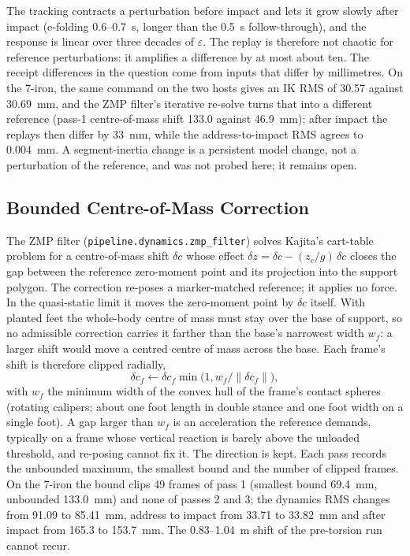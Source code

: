 \documentclass[11pt,a4paper]{article}
\begin{document}
The tracking contracts a perturbation before impact and lets it grow slowly
after impact (e-folding 0.6--0.7~s, longer than the 0.5~s follow-through),
and the response is linear over three decades of $\varepsilon$. The replay is
therefore not chaotic for reference perturbations: it amplifies a difference
by at most about ten. The receipt differences in the question come from
inputs that differ by millimetres. On the 7-iron, the same command on the two
hosts gives an IK RMS of 30.57 against 30.69~mm, and the ZMP filter's
iterative re-solve turns that into a different reference (pass-1
centre-of-mass shift 133.0 against 46.9~mm); after impact the replays then
differ by 33~mm, while the address-to-impact RMS agrees to 0.004~mm. A
segment-inertia change is a persistent model change, not a perturbation of
the reference, and was not probed here; it remains open.

\subsection{Bounded Centre-of-Mass Correction}
The ZMP filter (\texttt{pipeline.dynamics.zmp\_filter}) solves Kajita's
cart-table problem for a centre-of-mass shift $\delta c$ whose effect
$\delta z = \delta c - (z_c/g)\,\delta\ddot c$ closes the gap between the
reference zero-moment point and its projection into the support polygon.
The correction re-poses a marker-matched reference; it applies no force. In
the quasi-static limit it moves the zero-moment point by $\delta c$ itself.
With planted feet the whole-body centre of mass must stay over the base of
support, so no admissible correction carries it farther than the base's
narrowest width $w_f$: a larger shift would move a centred centre of mass
across the base. Each frame's shift is therefore clipped radially,
\[
  \delta c_f \leftarrow \delta c_f \min\bigl(1, w_f / \lVert \delta c_f \rVert\bigr),
\]
with $w_f$ the minimum width of the convex hull of the frame's contact
spheres (rotating calipers; about one foot length in double stance and one
foot width on a single foot). A gap larger than $w_f$ is an acceleration the
reference demands, typically on a frame whose vertical reaction is barely
above the unloaded threshold, and re-posing cannot fix it. The direction is
kept. Each pass records the unbounded maximum, the smallest bound and the
number of clipped frames. On the 7-iron the bound clips 49 frames of pass 1
(smallest bound 69.4~mm, unbounded 133.0~mm) and none of passes 2 and 3; the
dynamics RMS changes from 91.09 to 85.41~mm, address to impact from 33.71 to
33.82~mm and after impact from 165.3 to 153.7~mm. The 0.83--1.04~m shift of
the pre-torsion run cannot recur.
\end{document}
